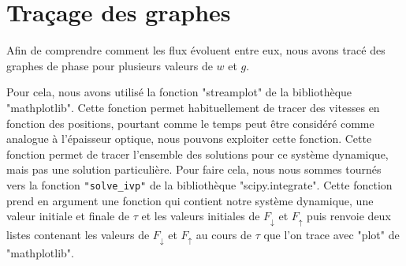 \documentclass[12pt]{article}
\begin{document}
\section{Traçage des graphes}
    Afin de comprendre comment les flux évoluent entre eux, nous avons tracé des graphes de phase pour plusieurs valeurs de $w$ et $g$. \par
    Pour cela, nous avons utilisé la fonction "streamplot" de la bibliothèque "mathplotlib". Cette fonction permet habituellement de tracer des vitesses en fonction des positions, pourtant comme le temps peut être considéré comme analogue à l'épaisseur optique, nous pouvons exploiter cette fonction. Cette fonction permet de tracer l'ensemble des solutions pour ce système dynamique, mais pas une solution particulière. Pour faire cela, nous nous sommes tournés vers la fonction \verb|"solve_ivp"| de la bibliothèque "scipy.integrate". Cette fonction prend en argument une fonction qui contient notre système dynamique, une valeur initiale et finale de $\tau$ et les valeurs initiales de $F_{\downarrow}$ et $F_{\uparrow}$ puis renvoie deux listes contenant les valeurs de $F_{\downarrow}$ et $F_{\uparrow}$ au cours de $\tau$ que l'on trace avec "plot" de "mathplotlib".
\end{document}
